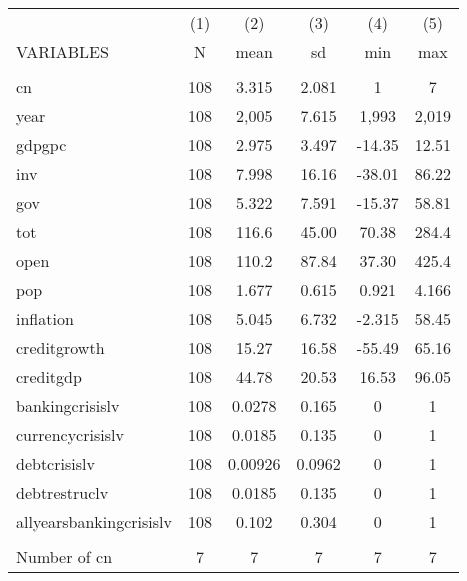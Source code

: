 \documentclass[]{article}
\begin{document}
\begin{tabular}{lccccc} \hline
 & (1) & (2) & (3) & (4) & (5) \\
VARIABLES & N & mean & sd & min & max \\ \hline
 &  &  &  &  &  \\
cn & 108 & 3.315 & 2.081 & 1 & 7 \\
year & 108 & 2,005 & 7.615 & 1,993 & 2,019 \\
gdpgpc & 108 & 2.975 & 3.497 & -14.35 & 12.51 \\
inv & 108 & 7.998 & 16.16 & -38.01 & 86.22 \\
gov & 108 & 5.322 & 7.591 & -15.37 & 58.81 \\
tot & 108 & 116.6 & 45.00 & 70.38 & 284.4 \\
open & 108 & 110.2 & 87.84 & 37.30 & 425.4 \\
pop & 108 & 1.677 & 0.615 & 0.921 & 4.166 \\
inflation & 108 & 5.045 & 6.732 & -2.315 & 58.45 \\
creditgrowth & 108 & 15.27 & 16.58 & -55.49 & 65.16 \\
creditgdp & 108 & 44.78 & 20.53 & 16.53 & 96.05 \\
bankingcrisislv & 108 & 0.0278 & 0.165 & 0 & 1 \\
currencycrisislv & 108 & 0.0185 & 0.135 & 0 & 1 \\
debtcrisislv & 108 & 0.00926 & 0.0962 & 0 & 1 \\
debtrestruclv & 108 & 0.0185 & 0.135 & 0 & 1 \\
allyearsbankingcrisislv & 108 & 0.102 & 0.304 & 0 & 1 \\
 &  &  &  &  &  \\
 Number of cn & 7 & 7 & 7 & 7 & 7 \\ \hline
\end{tabular}
\end{document}
